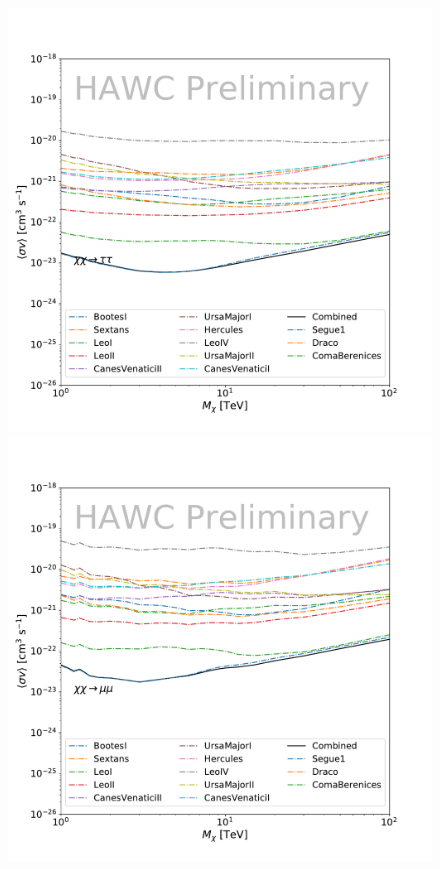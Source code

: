 \begin{figure}[ht]
{    \includegraphics[scale=0.215]{figures/glory_duck/hawc/Combined95_GD_tautau.pdf}
    \includegraphics[scale=0.215]{figures/glory_duck/hawc/Combined95_GD_mumu.pdf}
}
\end{figure}
